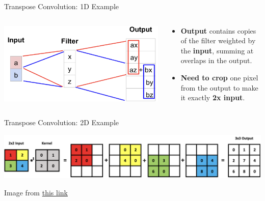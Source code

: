 \documentclass[serif, aspectratio=169]{beamer}
\begin{document}
\begin{frame}{Transpose Convolution: 1D Example}
    \begin{columns}[T]
        \begin{column}{0.75\textwidth}
            \centering
            \includegraphics[width=\textwidth]{pic/Transpose Conv 1d example.png}
        \end{column}

        \begin{column}{0.35\textwidth}
            \small
            \vspace{1cm}
            \begin{itemize}
                \item \textbf{Output} contains copies of the filter weighted by the \textbf{input}, summing at overlaps in the output.
                \item \textbf{Need to crop} one pixel from the output to make it exactly \textbf{2x input}.
            \end{itemize}
        \end{column}
    \end{columns}
\end{frame}


\begin{frame}{Transpose Convolution: 2D Example}

    \begin{center}
        \includegraphics[width=1.05\textwidth]{pic/Transpose Conv 2d example.png} 
    \end{center}

    \vspace{0.6cm}
    \tiny{Image from \href{https://mriquestions.com/upsampling.html}{this link}}
\end{frame}
\end{document}
